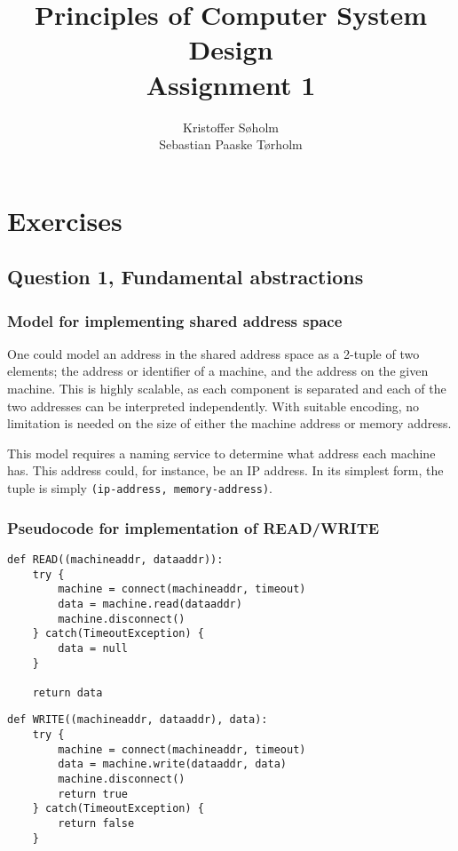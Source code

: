 \documentclass[11pt,a4paper]{article}
\title{Principles of Computer System Design\\Assignment 1}
\author{Kristoffer Søholm\\Sebastian Paaske Tørholm}
\begin{document}
\maketitle

\section{Exercises}
\subsection{Question 1, Fundamental abstractions}
\subsubsection{Model for implementing shared address space}
One could model an address in the shared address space as a 2-tuple of two
elements; the address or identifier of a machine, and the address on the given
machine. This is highly scalable, as each component is separated and each of
the two addresses can be interpreted independently. With suitable encoding,
no limitation is needed on the size of either the machine address or memory
address.

This model requires a naming service to determine what address each machine
has. This address could, for instance, be an IP address.
In its simplest form, the tuple is simply \texttt{(ip-address, memory-address)}.

\subsubsection{Pseudocode for implementation of READ/WRITE}

\begin{verbatim}
def READ((machineaddr, dataaddr)):
    try {
        machine = connect(machineaddr, timeout)
        data = machine.read(dataaddr)
        machine.disconnect()
    } catch(TimeoutException) {
        data = null
    }

    return data
\end{verbatim}

\begin{verbatim}
def WRITE((machineaddr, dataaddr), data):
    try {
        machine = connect(machineaddr, timeout)
        data = machine.write(dataaddr, data)
        machine.disconnect()
        return true
    } catch(TimeoutException) {
        return false
    }
\end{verbatim}
\end{document}
